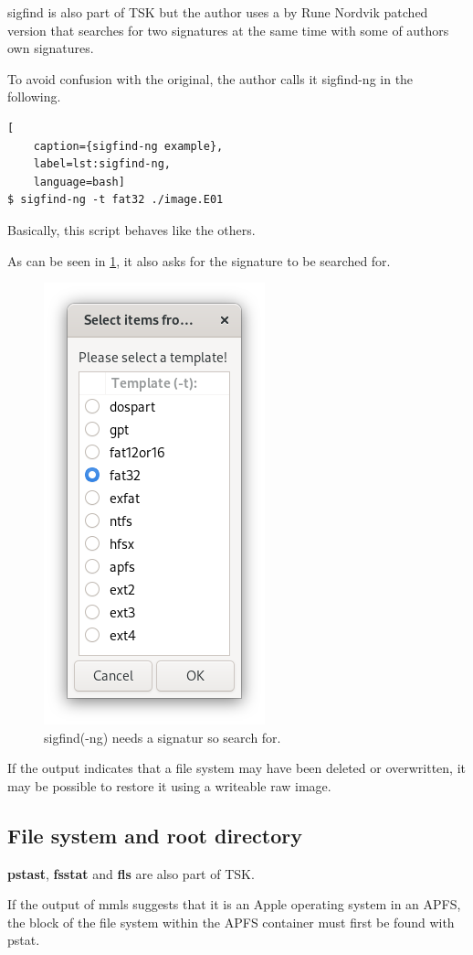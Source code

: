 sigfind is also part of TSK but the author uses a by Rune Nordvik patched version that searches for two signatures at the same time with some of authors own signatures.

To avoid confusion with the original, the author calls it sigfind-ng in the following.

\begin{lstlisting}[
    caption={sigfind-ng example},
    label=lst:sigfind-ng,
    language=bash]
$ sigfind-ng -t fat32 ./image.E01
\end{lstlisting}

\noindent Basically, this script behaves like the others.

As can be seen in \cref{fig:sigfind-ng}, it also asks for the signature to be searched for.

\begin{figure}[htbp]  %
  \centering
  \includegraphics[width=.25\textwidth]{figures/sigfind-ng.png}
  \caption[sigfind(-ng) signatures]{sigfind(-ng) needs a signatur so search for.}
  \label{fig:sigfind-ng}
\end{figure}

If the output indicates that a file system may have been deleted or overwritten, it may be possible to restore it using a writeable raw image.

\subsection{File system and root directory}

\textbf{pstast}, \textbf{fsstat} and \textbf{fls} are also part of TSK.

If the output of mmls suggests that it is an Apple operating system in an APFS, the block of the file system within the APFS container must first be found with pstat.

